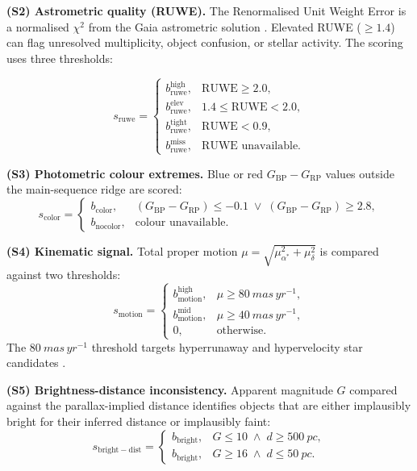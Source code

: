 \documentclass[preprint,12pt,authoryear]{elsarticle}
\begin{document}
\medskip\noindent\textbf{(S2) Astrometric quality (RUWE).} The Renormalised Unit Weight Error is a normalised $\chi^2$ from the Gaia astrometric solution \citep{Fabricius2021}. Elevated RUWE ($\ge 1.4$) can flag unresolved multiplicity, object confusion, or stellar activity. The scoring uses three thresholds:

\[
s_{\mathrm{ruwe}} =
\begin{cases}
b_{\mathrm{ruwe}}^{\mathrm{high}},  & \mathrm{RUWE} \ge 2.0, \\[2pt]
b_{\mathrm{ruwe}}^{\mathrm{elev}},   & 1.4 \le \mathrm{RUWE} < 2.0, \\[2pt]
b_{\mathrm{ruwe}}^{\mathrm{tight}}, & \mathrm{RUWE} < 0.9, \\[2pt]
b_{\mathrm{ruwe}}^{\mathrm{miss}},  & \text{RUWE unavailable}.
\end{cases}
\]

\medskip\noindent\textbf{(S3) Photometric colour extremes.} Blue or red $G_{\mathrm{BP}} - G_{\mathrm{RP}}$ values outside the main-sequence ridge are scored:
\[
s_{\mathrm{color}} =
\begin{cases}
b_{\mathrm{color}}, & (G_{\mathrm{BP}}-G_{\mathrm{RP}}) \le -0.1 \;\lor\; (G_{\mathrm{BP}}-G_{\mathrm{RP}}) \ge 2.8, \\
b_{\mathrm{nocolor}}, & \text{colour unavailable}.
\end{cases}
\]

\medskip\noindent\textbf{(S4) Kinematic signal.} Total proper motion $\mu = \sqrt{\mu_{\alpha^*}^2 + \mu_\delta^2}$ is compared against two thresholds:
\[
s_{\mathrm{motion}} =
\begin{cases}
b_{\mathrm{motion}}^{\mathrm{high}}, & \mu \ge \SI{80}{mas\,yr^{-1}}, \\[2pt]
b_{\mathrm{motion}}^{\mathrm{mid}},  & \mu \ge \SI{40}{mas\,yr^{-1}}, \\[2pt]
0, & \text{otherwise}.
\end{cases}
\]
The $\SI{80}{mas\,yr^{-1}}$ threshold targets hyperrunaway and hypervelocity star candidates \citep{Brown2015}.

\medskip\noindent\textbf{(S5) Brightness-distance inconsistency.} Apparent magnitude $G$ compared against the parallax-implied distance identifies objects that are either implausibly bright for their inferred distance or implausibly faint:
\[
s_{\mathrm{bright}\!-\!\mathrm{dist}} =
\begin{cases}
b_{\mathrm{bright}}, & G \le 10 \;\land\; d \ge \SI{500}{pc}, \\[2pt]
b_{\mathrm{bright}}, & G \ge 16 \;\land\; d \le \SI{50}{pc}.
\end{cases}
\]
\end{document}

